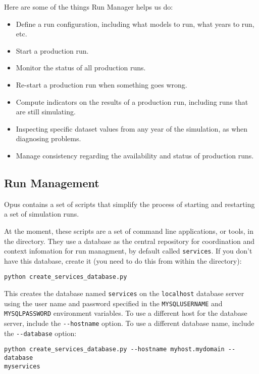 Here are some of the things Run Manager \runmanagerindex helps us do:
\begin{itemize}
  \item Define a run configuration, including what models to run, what years to
  run, etc.
  \item Start a production run.
  \item Monitor the status of all production runs.
  \item Re-start a production run when something goes wrong.
  \item Compute indicators on the results of a production run, including runs
  that are still simulating.
  \item Inspecting specific dataset values from any year of the simulation,
  as when diagnosing problems.
  \item Manage consistency regarding the availability and status of production runs.
\end{itemize}

\subsection{Run Management}
\label{sec:run-manager}
%
Opus contains a set of scripts that simplify the
process of starting and restarting a set of simulation runs.

At the moment, these scripts are a set of command line applications, or tools, in the
 directory.  They use a database as the central
repository for coordination and context infomation for run managment, by
default called \verb|services|.  If you don't have this database, create it
(you need to do this from within the 
directory):

\begin{verbatim}
python create_services_database.py
\end{verbatim}
This creates the database named \verb|services| on the \verb|localhost|
database server using the user name and password specified in the
\verb|MYSQLUSERNAME| \mysqlusernameindex and \verb|MYSQLPASSWORD| \mysqlpasswordindex environment variables. \environmentvariablesindex To use a
different host for the database server, include the \verb|--hostname|
option. To use a different database name, include the \verb|--database|
option:

\begin{verbatim}
python create_services_database.py --hostname myhost.mydomain --database
myservices
\end{verbatim}

